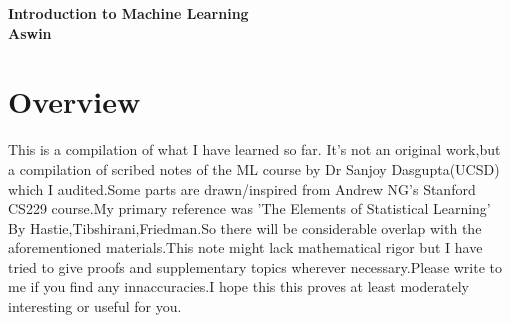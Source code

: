 \documentclass[12pt]{article}
\begin{document}
	
		\enlargethispage{2cm}
		
		\begin{center}
			
			\vspace*{-1cm}
			
			\textbf{\Large Introduction to Machine Learning     }\\[10pt]
			

\textbf{\Large Aswin}\\ [8pt]			
			
			\end{center}
		
\cleardoublepage

\section*{Overview}

This is a compilation of what I have learned so far. It’s not an original work,but a compilation of scribed notes of the ML course by Dr Sanjoy Dasgupta(UCSD) which I audited.Some parts are drawn/inspired from Andrew NG's Stanford CS229 course.My primary reference was 'The Elements of Statistical Learning' By Hastie,Tibshirani,Friedman.So there will be considerable overlap with the aforementioned materials.This note might lack mathematical rigor but I have tried to give proofs and supplementary topics wherever necessary.Please write to me if you find any innaccuracies.I hope this  this proves at least moderately
interesting or useful for you.
	
 
\end{document}
